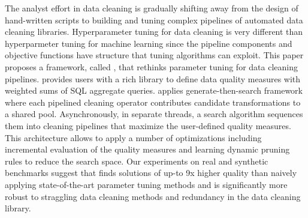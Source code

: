 \sloppy
The analyst effort in data cleaning is gradually shifting away from the design of hand-written scripts to building and tuning complex pipelines of automated data cleaning libraries.
Hyperparameter tuning for data cleaning is very different than hyperparmeter tuning for machine learning since the pipeline components and objective functions have structure that tuning algorithms can exploit.
This paper proposes a framework, called \sys, that rethinks parameter tuning for data cleaning pipelines.
\sys provides users with a rich library to define data quality measures with weighted sums of SQL aggregate queries.
\sys applies generate-then-search framework where each pipelined cleaning operator contributes candidate transformations to a shared pool.  Asynchronously, in separate threads, a search algorithm sequences them into cleaning pipelines that maximize the user-defined quality measures.
This architecture allows \sys to apply a number of optimizations including incremental evaluation of the quality measures and learning dynamic pruning rules to reduce the search space.
Our experiments on real and synthetic benchmarks suggest that \sys finds solutions of up-to 9x higher quality than naively applying state-of-the-art parameter tuning methods and is significantly more robust to straggling data cleaning methods and redundancy in the data cleaning library.